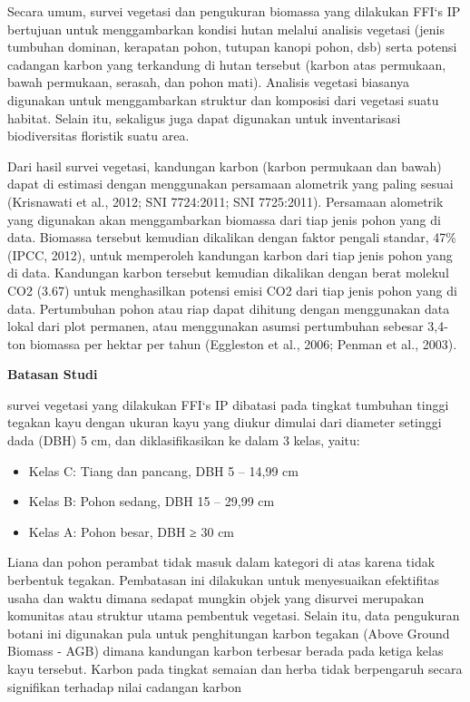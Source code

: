 \documentclass[
  oneside]{book}
\providecommand{\tightlist}{%
  \setlength{\itemsep}{0pt}\setlength{\parskip}{0pt}}
\begin{document}
Secara umum, survei vegetasi dan pengukuran biomassa yang dilakukan FFI`s IP bertujuan untuk menggambarkan kondisi hutan melalui analisis vegetasi (jenis tumbuhan dominan, kerapatan pohon, tutupan kanopi pohon, dsb) serta potensi cadangan karbon yang terkandung di hutan tersebut (karbon atas permukaan, bawah permukaan, serasah, dan pohon mati). Analisis vegetasi biasanya digunakan untuk menggambarkan struktur dan komposisi dari vegetasi suatu habitat. Selain itu, sekaligus juga dapat digunakan untuk inventarisasi biodiversitas floristik suatu area.

Dari hasil survei vegetasi, kandungan karbon (karbon permukaan dan bawah) dapat di estimasi dengan menggunakan persamaan alometrik yang paling sesuai (Krisnawati et al., 2012; SNI 7724:2011; SNI 7725:2011). Persamaan alometrik yang digunakan akan menggambarkan biomassa dari tiap jenis pohon yang di data. Biomassa tersebut kemudian dikalikan dengan faktor pengali standar, 47\% (IPCC, 2012), untuk memperoleh kandungan karbon dari tiap jenis pohon yang di data. Kandungan karbon tersebut kemudian dikalikan dengan berat molekul CO2 (3.67) untuk menghasilkan potensi emisi CO2 dari tiap jenis pohon yang di data. Pertumbuhan pohon atau riap dapat dihitung dengan menggunakan data lokal dari plot permanen, atau menggunakan asumsi pertumbuhan sebesar 3,4-ton biomassa per hektar per tahun (Eggleston et al., 2006; Penman et al., 2003).

\textbf{Batasan Studi}

survei vegetasi yang dilakukan FFI`s IP dibatasi pada tingkat tumbuhan tinggi tegakan kayu dengan ukuran kayu yang diukur dimulai dari diameter setinggi dada (DBH) 5 cm, dan diklasifikasikan ke dalam 3 kelas, yaitu:

\begin{itemize}
\tightlist
\item
  Kelas C: Tiang dan pancang, DBH 5 -- 14,99 cm
\item
  Kelas B: Pohon sedang, DBH 15 -- 29,99 cm
\item
  Kelas A: Pohon besar, DBH ≥ 30 cm
\end{itemize}

Liana dan pohon perambat tidak masuk dalam kategori di atas karena tidak berbentuk tegakan. Pembatasan ini dilakukan untuk menyesuaikan efektifitas usaha dan waktu dimana sedapat mungkin objek yang disurvei merupakan komunitas atau struktur utama pembentuk vegetasi. Selain itu, data pengukuran botani ini digunakan pula untuk penghitungan karbon tegakan (Above Ground Biomass - AGB) dimana kandungan karbon terbesar berada pada ketiga kelas kayu tersebut. Karbon pada tingkat semaian dan herba tidak berpengaruh secara signifikan terhadap nilai cadangan karbon
\end{document}
